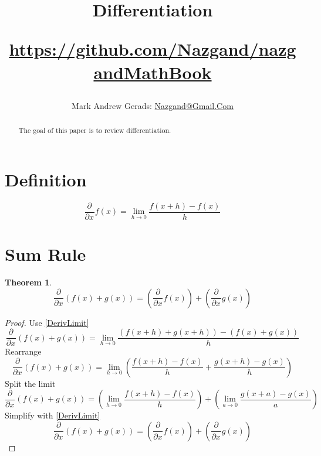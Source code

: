 \documentclass[]{article}
\author{Mark Andrew Gerads: \href{MailTo:Nazgand@Gmail.Com}{Nazgand@Gmail.Com}}
\title{
	Differentiation
	
	\href{https://github.com/Nazgand/nazgandMathBook}{https://github.com/Nazgand/nazgandMathBook}
}
\newcommand{\pqty}[1]{{\left(#1\right)}}
\newcommand{\pdiff}[2]{\frac{\partial^{#2}}{\partial #1^{#2}}}
\newtheorem{theorem}{Theorem}[section]
\numberwithin{equation}{section}
\begin{document}
	
	\maketitle
	
	\begin{abstract}
		The goal of this paper is to review differentiation.
	\end{abstract}
	
	\section{Definition}
	\begin{equation}
	\label{DerivLimit}
	\pdiff{x}{}f\pqty{x}=\lim\limits_{h\to 0}\frac{f\pqty{x+h}-f\pqty{x}}{h}
	\end{equation}
	
	\section{Sum Rule}
	\begin{theorem}
		\begin{equation}
		\label{DiffSum}
		\pdiff{x}{}\pqty{f\pqty{x}+g\pqty{x}}=
		\pqty{\pdiff{x}{}f\pqty{x}}+
		\pqty{\pdiff{x}{}g\pqty{x}}
		\end{equation}
	\end{theorem}
	\begin{proof}
		Use \eqref{DerivLimit}
		\begin{equation}
		\pdiff{x}{}\pqty{f\pqty{x}+g\pqty{x}}
		=\lim\limits_{h\to 0}
		\frac{\pqty{f\pqty{x+h}+g\pqty{x+h}}-\pqty{f\pqty{x}+g\pqty{x}}}{h}
		\end{equation}
		Rearrange
		\begin{equation}
		\pdiff{x}{}\pqty{f\pqty{x}+g\pqty{x}}
		=\lim\limits_{h\to 0}
		\pqty{\frac{{f\pqty{x+h}-f\pqty{x}}}{h}
		+
		\frac{{g\pqty{x+h}-g\pqty{x}}}{h}}
		\end{equation}
		Split the limit
		\begin{equation}
		\pdiff{x}{}\pqty{f\pqty{x}+g\pqty{x}}
		=\pqty{\lim\limits_{h\to 0}
		\frac{{f\pqty{x+h}-f\pqty{x}}}{h}}
			+ \pqty{\lim\limits_{a\to 0}
			\frac{{g\pqty{x+a}-g\pqty{x}}}{a}}
		\end{equation}
		Simplify with \eqref{DerivLimit}
		\begin{equation}
		\pdiff{x}{}\pqty{f\pqty{x}+g\pqty{x}}=
		\pqty{\pdiff{x}{}f\pqty{x}}+
		\pqty{\pdiff{x}{}g\pqty{x}}
		\end{equation}
	\end{proof}
\end{document}

